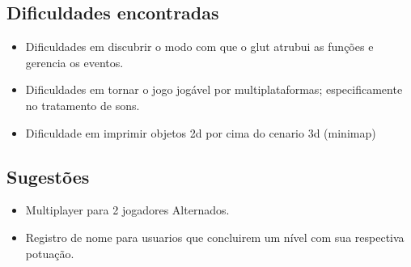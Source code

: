 

\subsection{Dificuldades encontradas}\label{dificuldades}

\begin{itemize}
	\item Dificuldades em discubrir o modo com que o glut atrubui as funções e gerencia os eventos.
	\item Dificuldades em tornar o jogo jogável por multiplataformas; especificamente no tratamento de sons.
	\item Dificuldade em imprimir objetos 2d por cima do cenario 3d (minimap)
\end{itemize}

\subsection{Sugestões}\label{sugest}

\begin{itemize}
	\item Multiplayer para 2 jogadores Alternados.
	\item Registro de nome para usuarios que concluirem um nível com sua respectiva potuação.
\end{itemize}



